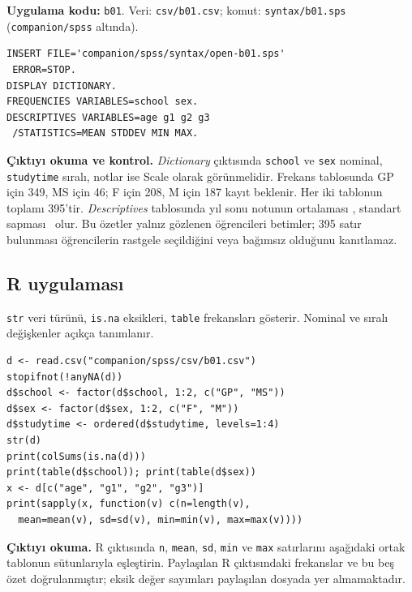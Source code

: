 \par\noindent\begin{minipage}{\linewidth}
\textbf{Uygulama kodu:} \texttt{b01}. Veri: \texttt{csv/b01.csv};
komut: \texttt{syntax/b01.sps} (\texttt{companion/spss} altında).

\begin{lstlisting}[style=prismSPSS]
INSERT FILE='companion/spss/syntax/open-b01.sps'
 ERROR=STOP.
DISPLAY DICTIONARY.
FREQUENCIES VARIABLES=school sex.
DESCRIPTIVES VARIABLES=age g1 g2 g3
 /STATISTICS=MEAN STDDEV MIN MAX.
\end{lstlisting}

\end{minipage}\par

\begin{outputguidebox}
\textbf{Çıktıyı okuma ve kontrol.}
\emph{Dictionary} çıktısında \texttt{school} ve \texttt{sex} nominal,
\texttt{studytime} sıralı, notlar ise Scale olarak görünmelidir.
Frekans tablosunda GP için 349, MS için 46; F için 208, M için 187 kayıt
beklenir. Her iki tablonun toplamı 395'tir. \emph{Descriptives} tablosunda
yıl sonu notunun ortalaması \SPMatMean, standart sapması \SPMatSD\ olur.
Bu özetler yalnız gözlenen öğrencileri betimler; 395 satır bulunması
öğrencilerin rastgele seçildiğini veya bağımsız olduğunu kanıtlamaz.
\end{outputguidebox}


\par\noindent\begin{minipage}{\linewidth}
\subsection{R uygulaması}
\label{sec:r-gercek-b01}

\texttt{str} veri türünü, \texttt{is.na} eksikleri, \texttt{table} frekansları gösterir. Nominal ve sıralı değişkenler açıkça tanımlanır.

\begin{lstlisting}[style=prismR]
d <- read.csv("companion/spss/csv/b01.csv")
stopifnot(!anyNA(d))
d$school <- factor(d$school, 1:2, c("GP", "MS"))
d$sex <- factor(d$sex, 1:2, c("F", "M"))
d$studytime <- ordered(d$studytime, levels=1:4)
str(d)
print(colSums(is.na(d)))
print(table(d$school)); print(table(d$sex))
x <- d[c("age", "g1", "g2", "g3")]
print(sapply(x, function(v) c(n=length(v),
  mean=mean(v), sd=sd(v), min=min(v), max=max(v))))
\end{lstlisting}

\textbf{Çıktıyı okuma.} R çıktısında \texttt{n}, \texttt{mean},
\texttt{sd}, \texttt{min} ve \texttt{max} satırlarını aşağıdaki ortak
tablonun sütunlarıyla eşleştirin. Paylaşılan R çıktısındaki frekanslar
ve bu beş özet doğrulanmıştır; eksik değer sayımları paylaşılan dosyada
yer almamaktadır.
\end{minipage}\par

